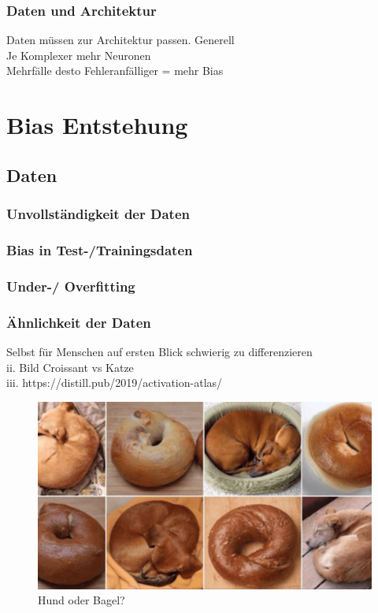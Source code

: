 \documentclass[12pt,oneside,a4paper,parskip]{scrbook}
\begin{document}
\subsection{Daten und Architektur}
Daten müssen zur Architektur passen.
Generell
\\	Je Komplexer mehr Neuronen
\\	Mehrfälle desto Fehleranfälliger = mehr Bias

\chapter{Bias Entstehung}
\section{Daten}
\subsection{Unvollständigkeit der Daten}
\subsection{Bias in Test-/Trainingsdaten}
\subsection{Under-/ Overfitting}
\subsection{Ähnlichkeit der Daten}
Selbst für Menschen auf ersten Blick schwierig zu differenzieren 
\\ii.	Bild Croissant vs Katze
\\iii.	https://distill.pub/2019/activation-atlas/

\begin{figure}[h]
	\begin{center}
		\includegraphics[width=15cm]{Bilder/dog_or_bagel.jpg}
		\caption{Hund oder Bagel?}
		\label{fig:dogBagel}
	\end{center}
\end{figure}
\end{document}
